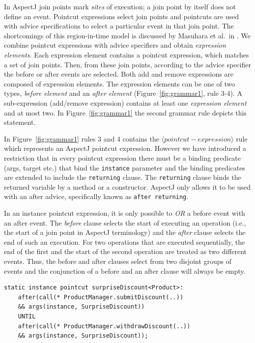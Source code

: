 \documentclass{acm_proc_article-sp}
\begin{document}
 
In AspectJ join points mark \emph{sites} of execution; a join point by itself does not define an event. 
Pointcut expressions select join points and pointcuts are used with advice specifications to select a particular event in that join point. The shortcomings of this region-in-time model is discussed by Masuhara et al.\ in \cite{masuharafine}.
We combine pointcut expressions with advice specifiers and obtain \emph{expression elements}. Each expression element contains a pointcut expression, which matches a set of join points. Then, from these join points, according to the advice specifier the before or after events are selected.
Both add and remove expressions are composed of expression elements. The expression elements can be one of two types, \emph{before element} and an \emph{after element} (Figure~\ref{fig:grammar1}, rule 3-4). A sub-expression (add/remove expression) contains at least one \emph{expression element} and at most two. In Figure~\ref{fig:grammar1} the second grammar rule depicts this statement. 

In Figure~\ref{fig:grammar1} rules 3 and 4 contains the $\langle pointcut-expression\rangle$ rule which represents an AspectJ pointcut expression. However we have introduced a restriction that in every pointcut expression there must be a binding predicate (args, target etc.) that bind the \lstinline{instance} parameter and the binding predicates are extended to include the \lstinline{returning} clause. The \lstinline{returning} clause binds the returned variable by a method or a constructor. AspectJ only allows it to be used with an after advice, specifically known as \texttt{after returning}. 

In an instance pointcut expression, it is only possible to \emph{OR} a before event with an after event. 
The \emph{before} clause selects the start of executing an operation (i.e., the start of a join point in AspectJ terminology) and the \emph{after} clause selects the end of such an execution. 
For two operations that are executed sequentially, the end of the first and the start of the second operation are treated as two different events. Thus, the before and after clauses select from two disjoint groups of events and the conjunction of a before and an after clause will always be empty.

\begin{lstlisting}[float=h!, caption={A basic instance pointcut declaration with add and remove expressions}, label={lst:basic}]
static instance pointcut surpriseDiscount<Product>: 
	after(call(* ProductManager.submitDiscount(..)) 
	&& args(instance, SurpriseDiscount)) 
	UNTIL 
	after(call(* ProductManager.withdrawDiscount(..)) 
	&& args(instance, SurpriseDiscount));
\end{lstlisting}
\end{document}
